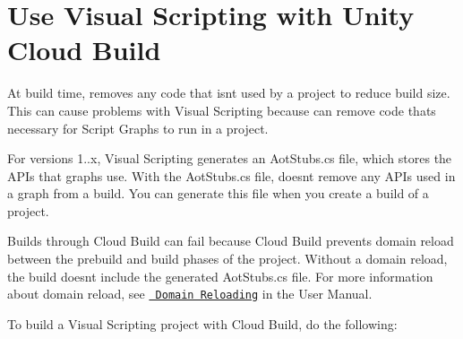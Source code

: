 \chapter{Use Visual Scripting with Unity Cloud Build}
\hypertarget{md__library_2_package_cache_2com_8unity_8visualscripting_0d1_89_82_2_documentation_0i_2vs-aot}{}\label{md__library_2_package_cache_2com_8unity_8visualscripting_0d1_89_82_2_documentation_0i_2vs-aot}
\label{md__library_2_package_cache_2com_8unity_8visualscripting_0d1_89_82_2_documentation_0i_2vs-aot_autotoc_md1677}%
%
 At build time,  removes any code that isn\textquotesingle{}t used by a project to reduce build size. This can cause problems with Visual Scripting because  can remove code that\textquotesingle{}s necessary for Script Graphs to run in a project.

For versions 1..\+x, Visual Scripting generates an {\ttfamily Aot\+Stubs.\+cs} file, which stores the  APIs that graphs use. With the {\ttfamily Aot\+Stubs.\+cs} file,  doesn\textquotesingle{}t remove any  APIs used in a graph from a build. You can generate this file when you create a build of a project.

Builds through  Cloud Build can fail because Cloud Build prevents domain reload between the prebuild and build phases of the project. Without a domain reload, the build doesn\textquotesingle{}t include the generated {\ttfamily Aot\+Stubs.\+cs} file. For more information about domain reload, see \href{https://docs.unity3d.com/Manual/DomainReloading.html}{\texttt{ Domain Reloading}} in the  User Manual.

To build a Visual Scripting project with Cloud Build, do the following\+:



